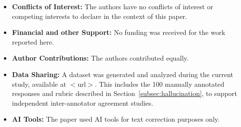\documentclass[a4paper,twoside]{article}
\begin{document}
\begin{itemize}
  \item \textbf{Conflicts of Interest:} The authors have no conflicts of interest or competing interests to declare in the context of this paper.
  \item \textbf{Financial and other Support:} No funding was received for the work reported here.
  \item \textbf{Author Contributions:} The authors contributed equally.
  \item \textbf{Data Sharing:} A dataset was generated and analyzed during the current study, available at $<$url$>$. This includes the 100 manually annotated responses and rubric described in Section~\ref{subsec:hallucination}, to support independent inter-annotator agreement studies.
  \item \textbf{AI Tools:} The paper used AI tools for text correction purposes only.
\end{itemize}
\end{document}

